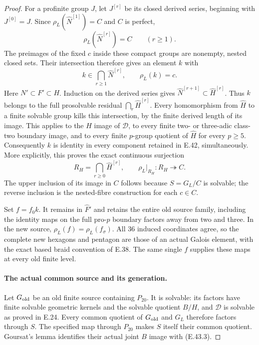 \begin{proof}
For a profinite group $J$, let $J^{[r]}$
be its closed derived series, beginning
with $J^{[0]}=J$.
Since $\rho_L(\widehat N^{[1]})=C$
and $C$ is perfect,
\[
             \rho_L(\widehat N^{[r]})=C
                              \qquad(r\ge1).
 \tag{E.43.12}
\]
The preimages of the fixed $c$ inside
these compact groups are nonempty,
nested closed sets.  Their intersection
therefore gives an element $k$ with
\[
 k\in\bigcap_{r\ge1}\widehat N^{[r]},
                 \qquad \rho_L(k)=c.
 \tag{E.43.13}
\]
Here $N'\subset F'\subset H$.
Induction on the derived series gives
$\widehat N^{[r+1]}\subset\widehat H^{[r]}$.
Thus $k$ belongs to the full prosolvable
residual $\bigcap_r\widehat H^{[r]}$.
Every homomorphism from $\widehat H$
to a finite solvable group kills this
intersection, by the finite derived
length of its image.
This applies to the $H$ image of
$\mathscr D$, to every finite two- or
three-adic class-two boundary image,
and to every finite $p$-group quotient
of $\widehat H$ for every $p\ge5$.
Consequently $k$ is identity in every
component retained in E.42, simultaneously.
More explicitly, this proves the exact
continuous surjection
\[
 R_H=\bigcap_{r\ge0}\widehat H^{[r]},
 \qquad \rho_L|_{R_H}:R_H\twoheadrightarrow C.
 \tag{E.43.14}
\]
The upper inclusion of its image in $C$
follows because $S=G_L/C$ is solvable;
the reverse inclusion is the nested-fibre
construction for each $c\in C$.

Set $f=f_0k$.  It remains in
$\widehat F'$ and retains the entire
old source family, including the
identity maps on the full pro-$p$
boundary factors away from two and
three.  In the new source,
$\rho_L(f)=\rho_L(f_\sigma)$.
All $36$ induced coordinates agree,
so the complete new hexagons and
pentagon are those of an actual
Galois element, with the exact based
braid convention of E.38.
The same single $f$ supplies these
maps at every old finite level.

\paragraph{The actual common source and its generation.}
Let $G_{\rm old}$ be an old finite
source containing $P_{20}$.
It is solvable: its factors have
finite solvable geometric kernels
and the solvable quotient $B/H$,
and $\mathscr D$ is solvable as
proved in E.24.
Every common quotient of
$G_{\rm old}$ and $G_L$ therefore
factors through $S$.
The specified map through $P_{20}$
makes $S$ itself their common quotient.
Goursat's lemma identifies their
actual joint $B$ image with
\textup{(E.43.3)}.


\end{proof}
